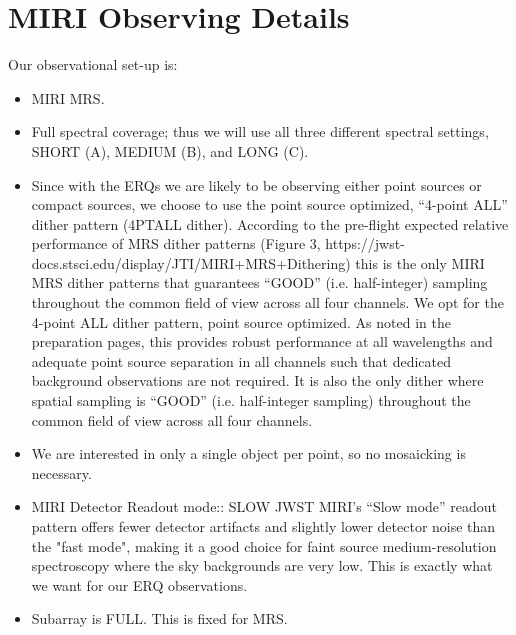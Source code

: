 \section*{MIRI Observing Details}
Our observational set-up is:
\begin{itemize}
    \item MIRI MRS.  

    \item Full spectral coverage; thus we will use all three different spectral settings, SHORT (A), MEDIUM (B), and LONG (C).  

    \item Since with the ERQs we are likely to be observing
      either point sources or compact sources, we choose to use the point
      source optimized, ``4-point ALL'' dither pattern (4PTALL
      dither). According to the pre-flight expected relative performance of
      MRS dither patterns (Figure 3,
      https://jwst-docs.stsci.edu/display/JTI/MIRI+MRS+Dithering) this is
      the only MIRI MRS dither patterns that guarantees ``GOOD''
      (i.e. half-integer) sampling throughout the common field of view
      across all four channels.
        We opt for the 4-point ALL dither pattern, point source
        optimized.  As noted in the preparation pages, this provides robust
        performance at all wavelengths and adequate point source separation in
        all channels such that dedicated background observations are not
        required. It is also the only dither where spatial sampling is ``GOOD''
        (i.e. half-integer sampling) throughout the common field of view
        across all four channels.

    \item We are interested in only a single object per point, so no mosaicking is necessary.  

    \item{MIRI Detector Readout mode:: SLOW 
        JWST MIRI's ``Slow mode'' readout pattern offers fewer detector
        artifacts and slightly lower detector noise than the "fast mode",
        making it a good choice for faint source medium-resolution
        spectroscopy where the sky backgrounds are very low. This is 
        exactly what we want for our ERQ observations.}

    \item{Subarray is FULL. This is fixed for MRS.}

\end{itemize}

